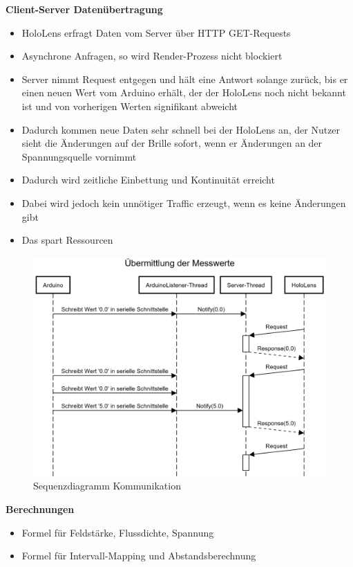 \textbf{Client-Server Datenübertragung}
\begin{itemize}
	\item HoloLens erfragt Daten vom Server über HTTP GET-Requests
	\item Asynchrone Anfragen, so wird Render-Prozess nicht blockiert
	\item Server nimmt Request entgegen und hält eine Antwort solange zurück, bis er einen neuen Wert vom Arduino erhält, der der HoloLens noch nicht bekannt ist und von vorherigen Werten signifikant abweicht
	\item Dadurch kommen neue Daten sehr schnell bei der HoloLens an, der Nutzer sieht die Änderungen auf der Brille sofort, wenn er Änderungen an der Spannungsquelle vornimmt
	\item Dadurch wird zeitliche Einbettung und Kontinuität erreicht
	\item Dabei wird jedoch kein unnötiger Traffic erzeugt, wenn es keine Änderungen gibt
	\item Das spart Ressourcen
\end{itemize}
\begin{figure}[h!]
	\centering
	\includegraphics[width=1\textwidth]{images/Sequenzdiagramm.png}
	\caption{Sequenzdiagramm Kommunikation}
	\label{img:Sequenzdiagramm}
\end{figure}


\textbf{Berechnungen}
\begin{itemize}
	\item Formel für Feldstärke, Flussdichte, Spannung
	\item Formel für Intervall-Mapping und Abstandsberechnung
\end{itemize}


